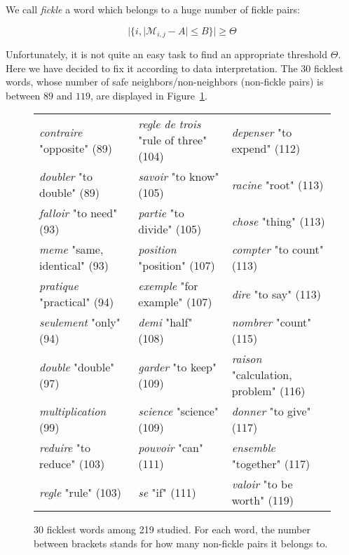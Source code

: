 \documentclass[preprint]{elsarticle}
\begin{document}
We call \textit{fickle} a word which belongs to a huge number of fickle pairs:

$$|\{i,|\mathcal{M}_{i,j}-A| \leq B \}| \geq \Theta$$

Unfortunately, it is not quite an easy task to find an appropriate threshold $\Theta$. Here we have decided to fix it according to data interpretation. The $30$ ficklest words, whose number of safe neighbors/non-neighbors (non-fickle pairs) is between $89$ and $119$, are displayed in Figure~\ref{fig:ficklest}.

\begin{center}
\begin{figure}
\begin{small}
\begin{tabular}{|lll|}
\hline
\textit{contraire} "opposite" (89) & \textit{regle de trois} "rule of three" (104) & \textit{depenser} "to expend" (112) \\
\textit{doubler} "to double" (89) & \textit{savoir}  "to know" (105) & \textit{racine} "root" (113) \\
\textit{falloir} "to need" (93) & \textit{partie} "to divide" (105) & \textit{chose} "thing" (113) \\
\textit{meme} "same, identical" (93) &  \textit{position} "position" (107) & \textit{compter} "to count" (113) \\
\textit{pratique} "practical" (94) &  \textit{exemple} "for example" (107) & \textit{dire} "to say" (113) \\
\textit{seulement}  "only" (94) &  \textit{demi} "half"  (108) & \textit{nombrer} "count" (115) \\
\textit{double} "double" (97) &  \textit{garder} "to keep"(109) & \textit{raison} "calculation, problem" (116) \\
\textit{multiplication} (99) &  \textit{science} "science" (109) & \textit{donner} "to give" (117) \\
\textit{reduire} "to reduce" (103) & \textit{pouvoir} "can" (111) & \textit{ensemble} "together" (117) \\
\textit{regle} "rule" (103) & \textit{se} "if" (111) & \textit{valoir} "to be worth" (119)\\
\hline
\end{tabular}

\end{small}
\caption{30 ficklest words among 219 studied. For each word, the number between brackets stands for how many non-fickle pairs it belongs to.}
\label{fig:ficklest}
\end{figure}
\end{center}
\end{document}
